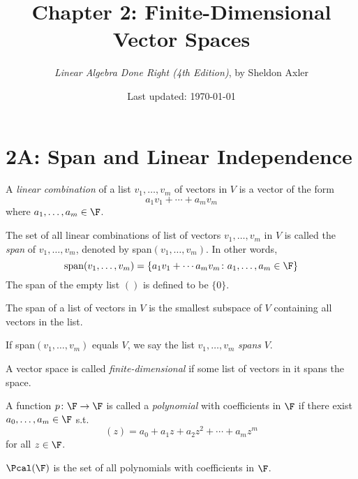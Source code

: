 \documentclass{extarticle}
\title{\vspace{-2em}Chapter 2: Finite-Dimensional Vector Spaces}
\author{\emph{Linear Algebra Done Right (4th Edition)}, by Sheldon Axler}
\date{Last updated: \today}
\begin{document}
\maketitle 
\tableofcontents
\newpage

\section*{2A: Span and Linear Independence}

\begin{definition}
    A \emph{linear combination} of a list \(v_1, \ldots, v_m\) of vectors in \(V\)
    is a vector of the form 
    \[a_1 v_1 + \cdots + a_m v_m\]
    where \(a_1, \ldots, a_m \in \F\).
\end{definition}

\begin{definition}[Span]
    The set of all linear combinations of list of vectors \(v_1, \ldots, v_m\) 
    in \(V\) is called the \emph{span} of \(v_1, \ldots, v_m\), denoted by 
    span\((v_1, \ldots, v_m)\). In other words, 
    \[\text{span}(v_1, \ldots, v_m) = \{a_1 v_1 + \cdots a_m v_m \colon a_1, \ldots, a_m \in \F\}\]
    The span of the empty list \(()\) is defined to be \(\{0\}\).
\end{definition}

\begin{thm}
    The span of a list of vectors in \(V\) is the smallest subspace of \(V\) 
    containing all vectors in the list.
\end{thm}

\begin{definition}[Spans]
    If span\((v_1, \ldots, v_m)\) equals \(V\), we say the list \(v_1, \ldots, v_m\)
    \emph{spans} \(V\). 
\end{definition}

\begin{definition}
    A vector space is called \emph{finite-dimensional} if some list of vectors 
    in it spans the space.
\end{definition}

\begin{definition}[polynomial]
    A function \(p \colon \F \to \F\) is called a \emph{polynomial} with coefficients
    in \(\F\) if there exist \(a_0, \ldots, a_m \in \F\) s.t. 
    \[(z) = a_0 + a_1 z + a_2 z^2 + \cdots + a_m z^m\]
    for all \(z \in \F\).

    \(\Pcal(\F)\) is the set of all polynomials with coefficients in \(\F\).
\end{definition}
\end{document}
